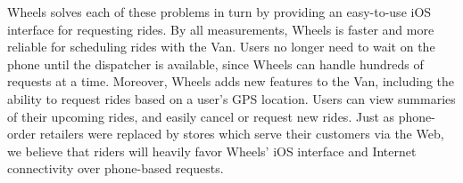 \documentclass[12pt, a4paper]{article}
\begin{document}
\begin{multicols*}{2}
Wheels solves each of these problems in turn by providing an easy-to-use iOS interface for requesting rides. By all measurements, Wheels is faster and more reliable for scheduling rides with the Van. Users no longer need to wait on the phone until the dispatcher is available, since Wheels can handle hundreds of requests at a time. Moreover, Wheels adds new features to the Van, including the ability to request rides based on a user's GPS location. Users can view summaries of their upcoming rides, and easily cancel or request new rides. Just as phone-order retailers were replaced by stores which serve their customers via the Web, we believe that riders will heavily favor Wheels' iOS interface and Internet connectivity over phone-based requests.
\end{multicols*}
\end{document}
